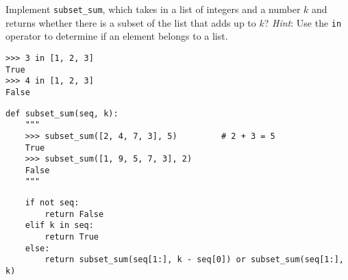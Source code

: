 \begin{blocksection}
\question Implement \lstinline$subset_sum$, which takes in a list of integers and
a number $k$ and returns whether there is a subset of the list that adds up to
$k$? \emph{Hint}: Use the \lstinline$in$ operator to determine if an element
belongs to a list.

\begin{lstlisting}
>>> 3 in [1, 2, 3]
True
>>> 4 in [1, 2, 3]
False
\end{lstlisting}

\begin{lstlisting}
def subset_sum(seq, k):
    """
    >>> subset_sum([2, 4, 7, 3], 5)         # 2 + 3 = 5
    True
    >>> subset_sum([1, 9, 5, 7, 3], 2)
    False
    """
\end{lstlisting}

\begin{solution}[1.5in]
\begin{lstlisting}
    if not seq:
        return False
    elif k in seq:
        return True
    else:
        return subset_sum(seq[1:], k - seq[0]) or subset_sum(seq[1:], k)
\end{lstlisting}
\end{solution}
\end{blocksection}
